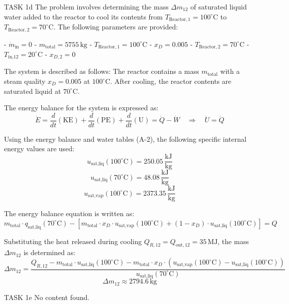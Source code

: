 TASK 1d  
The problem involves determining the mass \( \Delta m_{12} \) of saturated liquid water added to the reactor to cool its contents from \( T_{\text{Reactor},1} = 100^\circ\text{C} \) to \( T_{\text{Reactor},2} = 70^\circ\text{C} \). The following parameters are provided:  

- \( \dot{m}_{\text{in}} = 0 \)  
- \( m_{\text{total}} = 5755 \, \text{kg} \)  
- \( T_{\text{Reactor},1} = 100^\circ\text{C} \)  
- \( x_D = 0.005 \)  
- \( T_{\text{Reactor},2} = 70^\circ\text{C} \)  
- \( T_{\text{in,12}} = 20^\circ\text{C} \)  
- \( x_{D,2} = 0 \)  

The system is described as follows:  
The reactor contains a mass \( m_{\text{total}} \) with a steam quality \( x_D = 0.005 \) at \( 100^\circ\text{C} \). After cooling, the reactor contents are saturated liquid at \( 70^\circ\text{C} \).  

The energy balance for the system is expressed as:  
\[
\dot{E} = \frac{d}{dt} (\text{KE}) + \frac{d}{dt} (\text{PE}) + \frac{d}{dt} (\text{U}) = \dot{Q} - \dot{W} \quad \Rightarrow \quad \dot{U} = \dot{Q}
\]  

Using the energy balance and water tables (A-2), the following specific internal energy values are used:  
\[
u_{\text{sat,liq}}(100^\circ\text{C}) = 250.05 \, \frac{\text{kJ}}{\text{kg}}
\]  
\[
u_{\text{sat,liq}}(70^\circ\text{C}) = 48.08 \, \frac{\text{kJ}}{\text{kg}}
\]  
\[
u_{\text{sat,vap}}(100^\circ\text{C}) = 2373.35 \, \frac{\text{kJ}}{\text{kg}}
\]  

The energy balance equation is written as:  
\[
m_{\text{total}} \cdot q_{\text{sat,liq}}(70^\circ\text{C}) - \left[ m_{\text{total}} \cdot x_D \cdot u_{\text{sat,vap}}(100^\circ\text{C}) + (1 - x_D) \cdot u_{\text{sat,liq}}(100^\circ\text{C}) \right] = Q
\]  

Substituting the heat released during cooling \( Q_{R,12} = Q_{\text{out},12} = 35 \, \text{MJ} \), the mass \( \Delta m_{12} \) is determined as:  
\[
\Delta m_{12} = \frac{Q_{R,12} - m_{\text{total}} \cdot u_{\text{sat,liq}}(100^\circ\text{C}) - m_{\text{total}} \cdot x_D \cdot (u_{\text{sat,vap}}(100^\circ\text{C}) - u_{\text{sat,liq}}(100^\circ\text{C}))}{u_{\text{sat,liq}}(70^\circ\text{C})}
\]  
\[
\Delta m_{12} \approx 2794.6 \, \text{kg}
\]  

TASK 1e  
No content found.
